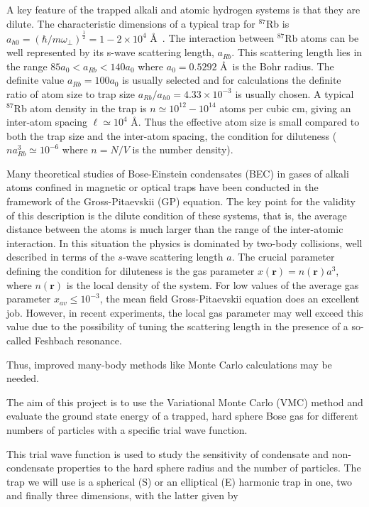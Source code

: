 \documentclass[%
oneside,                 %
final,                   %
10pt]{article}
\begin{document}
 A key feature of the trapped alkali and atomic hydrogen systems is that they are
 dilute. The characteristic dimensions of a typical trap for $^{87}$Rb is
 $a_{h0}=\left( {\hbar}/{m\omega_\perp}\right)^\frac{1}{2}=1-2 \times 10^4$
 \AA\ . The interaction between $^{87}$Rb atoms can be well represented
 by its s-wave scattering length, $a_{Rb}$. This scattering length lies in the
 range $85 a_0 < a_{Rb} < 140 a_0$ where $a_0 = 0.5292$ \AA\ is the Bohr radius.
 The definite value $a_{Rb} = 100 a_0$ is usually selected and
 for calculations the definite ratio of atom size to trap size 
 $a_{Rb}/a_{h0} = 4.33 \times 10^{-3}$ 
 is usually chosen. A typical $^{87}$Rb atom
 density in the trap is $n \simeq 10^{12}- 10^{14}$ atoms per cubic cm, giving an
 inter-atom spacing $\ell \simeq 10^4$ \AA. Thus the effective atom size is small
 compared to both the trap size and the inter-atom spacing, the condition
 for diluteness ($na^3_{Rb} \simeq 10^{-6}$ where $n = N/V$ is the number
 density). 

Many theoretical studies of Bose-Einstein condensates (BEC) in gases
of alkali atoms confined in magnetic or optical traps have been
conducted in the framework of the Gross-Pitaevskii (GP) equation.  The
key point for the validity of this description is the dilute condition
of these systems, that is, the average distance between the atoms is
much larger than the range of the inter-atomic interaction. In this
situation the physics is dominated by two-body collisions, well
described in terms of the $s$-wave scattering length $a$.  The crucial
parameter defining the condition for diluteness is the gas parameter
$x(\mathbf{r})= n(\mathbf{r}) a^3$, where $n(\mathbf{r})$ is the local density
of the system. For low values of the average gas parameter $x_{av}\le 10^{-3}$, the mean field Gross-Pitaevskii equation does an excellent
job.  However,
in recent experiments, the local gas parameter may well exceed this
value due to the possibility of tuning the scattering length in the
presence of a so-called Feshbach resonance.

Thus, improved many-body methods like Monte Carlo calculations may be
needed.

The aim of this project is to use the Variational Monte Carlo
(VMC) method and evaluate the ground state energy of a trapped, hard
sphere Bose gas for different numbers of particles with a specific
trial wave function.

 This trial wave function is used to study the sensitivity of
 condensate and non-condensate properties to the hard sphere radius
 and the number of particles.  The trap we will use is a spherical (S)
 or an elliptical (E) harmonic trap in one, two and finally three
 dimensions, with the latter given by
\end{document}
